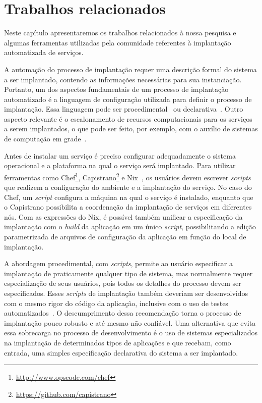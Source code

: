 
\chapter{Trabalhos relacionados}
\label{cap:relacionados}

Neste capítulo apresentaremos os trabalhos relacionados à nossa pesquisa e algumas ferramentas utilizadas pela comunidade referentes à implantação automatizada de serviços. 

A automação do processo de implantação requer uma descrição formal do sistema a ser implantado, contendo as informações necessárias para sua instanciação. Portanto, um dos aspectos fundamentais de um processo de implantação automatizado é a linguagem de configuração utilizada para definir o processo de implantação. Essa linguagem pode ser procedimental~\cite{Dolstra2005Configuration} ou declarativa~\cite{Magee1996Dynamic, Balter1998Olan}. Outro aspecto relevante é o escalonamento de recursos computacionais para os serviços a serem implantados, o que pode ser feito, por exemplo, com o auxílio de sistemas de computação em grade~\cite{Watson2006Dynasoar}.

Antes de instalar um serviço é preciso configurar adequadamente o sistema operacional e a plataforma na qual o serviço será implantado. Para utilizar ferramentas como Chef\footnote{\url{http://www.opscode.com/chef}}, Capistrano\footnote{\url{https://github.com/capistrano}} e Nix~\cite{Dolstra2005Configuration}, os usuários devem escrever \textit{scripts} que realizem a configuração do ambiente e a implantação do serviço. No caso do Chef, um \textit{script} configura a máquina na qual o serviço é instalado, enquanto que o Capistrano possibilita a coordenação da implantação de serviços em diferentes nós. Com as expressões do Nix, é possível também unificar a especificação da implantação com o \textit{build} da aplicação em um único \textit{script}, possibilitando a edição parametrizada de arquivos de configuração da aplicação em função do local de implantação. 

A abordagem procedimental, com \textit{scripts}, permite ao usuário especificar a implantação de praticamente qualquer tipo de sistema, mas normalmente requer especialização de seus usuários, pois todos os detalhes do processo devem ser especificados. Esses \textit{scripts} de implantação também deveriam ser desenvolvidos com o mesmo rigor do código da aplicação, inclusive com o uso de testes automatizados~\cite{Humble2011Continuous}. O descumprimento dessa recomendação torna o processo de implantação pouco robusto e até mesmo não confiável. Uma alternativa que evita essa sobrecarga no processo de desenvolvimento é o uso de sistemas especializados na implantação de determinados tipos de aplicações e que recebam, como entrada, uma simples especificação declarativa do sistema a ser implantado.

